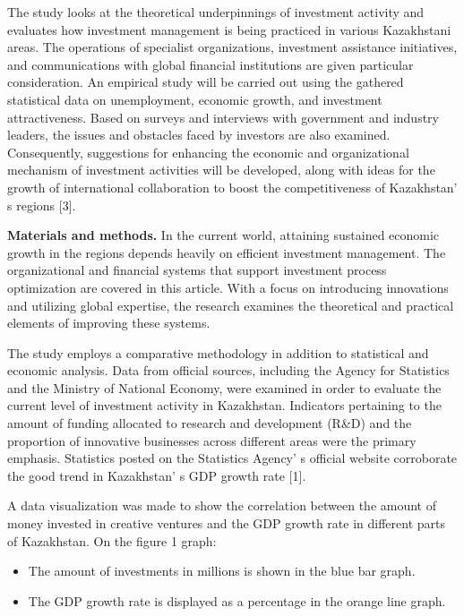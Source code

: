 The study looks at the theoretical underpinnings of investment activity
and evaluates how investment management is being practiced in various
Kazakhstani areas. The operations of specialist organizations,
investment assistance initiatives, and communications with global
financial institutions are given particular consideration. An empirical
study will be carried out using the gathered statistical data on
unemployment, economic growth, and investment attractiveness. Based on
surveys and interviews with government and industry leaders, the issues
and obstacles faced by investors are also examined. Consequently,
suggestions for enhancing the economic and organizational mechanism of
investment activities will be developed, along with ideas for the growth
of international collaboration to boost the competitiveness of
Kazakhstan' s regions {[}3{]}.

{\bfseries Materials and methods.} In the current world, attaining
sustained economic growth in the regions depends heavily on efficient
investment management. The organizational and financial systems that
support investment process optimization are covered in this article.
With a focus on introducing innovations and utilizing global expertise,
the research examines the theoretical and practical elements of
improving these systems.

The study employs a comparative methodology in addition to statistical
and economic analysis. Data from official sources, including the Agency
for Statistics and the Ministry of National Economy, were examined in
order to evaluate the current level of investment activity in
Kazakhstan. Indicators pertaining to the amount of funding allocated to
research and development (R\&D) and the proportion of innovative
businesses across different areas were the primary emphasis. Statistics
posted on the Statistics Agency' s official website
corroborate the good trend in Kazakhstan' s GDP growth
rate {[}1{]}.

A data visualization was made to show the correlation between the amount
of money invested in creative ventures and the GDP growth rate in
different parts of Kazakhstan. On the figure 1 graph:

\begin{itemize}
\item
  The amount of investments in millions is shown in the blue bar graph.
\item
  The GDP growth rate is displayed as a percentage in the orange line
  graph.
\end{itemize}

